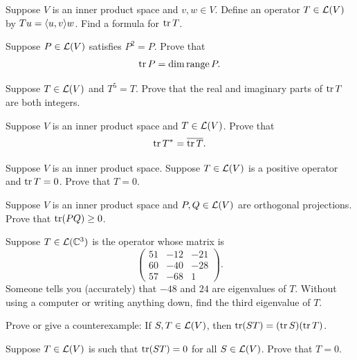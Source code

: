 \begin{exc}

\begin{exercise}
Suppose $V$ is an inner product space and $v,w\in V$. Define an operator
$T\in\mathcal{L}(V)$ by $Tu=\langle u, v \rangle w$. Find a formula for $\operatorname{tr} T$.
\end{exercise}

\begin{exercise}
Suppose $P\in\mathcal{L}(V)$ satisfies $P^2=P$. Prove that
\[ \operatorname{tr} P = \operatorname{dim}\operatorname{range} P. \]
\end{exercise}

\begin{exercise}
Suppose $T\in\mathcal{L}(V)$ and $T^5=T$. Prove that the real and imaginary parts of
$\operatorname{tr} T$ are both integers.
\end{exercise}

\begin{exercise}
Suppose $V$ is an inner product space and $T\in\mathcal{L}(V)$. Prove that
\[ \operatorname{tr} T^* = \overline{\operatorname{tr} T}. \]
\end{exercise}

\begin{exercise}
Suppose $V$ is an inner product space. Suppose $T\in\mathcal{L}(V)$ is a positive
operator and $\operatorname{tr} T=0$. Prove that $T=0$.
\end{exercise}

\begin{exercise}
Suppose $V$ is an inner product space and $P,Q\in\mathcal{L}(V)$ are orthogonal
projections. Prove that $\operatorname{tr}(PQ)\ge0$.
\end{exercise}

\begin{exercise}
Suppose $T\in\mathcal{L}(\mathbb{C}^3)$ is the operator whose matrix is
\[ \begin{pmatrix}
51 & -12 & -21\\
60 & -40 & -28\\
57 & -68 & 1
\end{pmatrix}. \]
Someone tells you (accurately) that $-48$ and $24$ are eigenvalues of $T$.
Without using a computer or writing anything down, find the third eigenvalue
of $T$.
\end{exercise}

\begin{exercise}
Prove or give a counterexample: If $S,T\in\mathcal{L}(V)$, then
$\operatorname{tr}(ST)=(\operatorname{tr} S)(\operatorname{tr} T)$.
\end{exercise}

\begin{exercise}
Suppose $T\in\mathcal{L}(V)$ is such that $\operatorname{tr}(ST)=0$ for all $S\in\mathcal{L}(V)$. Prove
that $T=0$.
\end{exercise}


\end{exc}
